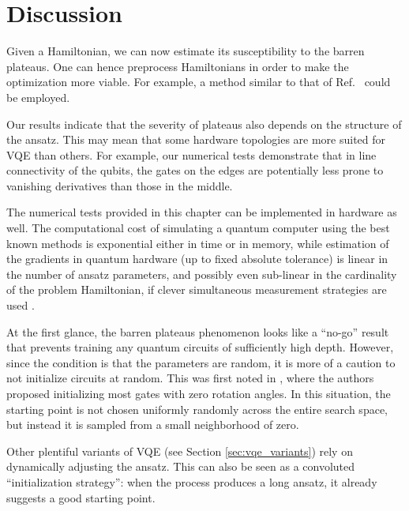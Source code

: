 
\section{Discussion}
Given a Hamiltonian, we can now estimate its susceptibility to the barren plateaus. One can hence preprocess Hamiltonians in order to make the optimization more viable. For example, a method similar to that of Ref.~\cite{ryabinkin_iterative_2020} could be employed.

Our results indicate that the severity of plateaus also depends on the structure of the ansatz. This may mean that some hardware topologies are more suited for VQE than others. For example, our numerical tests demonstrate that in line connectivity of the qubits, the gates on the edges are potentially less prone to vanishing derivatives than those in the middle.

The numerical tests provided in this chapter can be implemented in hardware as well. The computational cost of simulating a quantum computer using the best known methods is exponential either in time or in memory, while estimation of the gradients in quantum hardware (up to fixed absolute tolerance) is linear in the number of ansatz parameters, and possibly even sub-linear in the cardinality of the problem Hamiltonian, if clever simultaneous measurement strategies are used \cite{verteletskyi_measurement_2020}. 

At the first glance, the barren plateaus phenomenon looks like a ``no-go'' result that prevents training any quantum circuits of sufficiently high depth. However, since the condition is that the parameters are random, it is more of a caution to not initialize circuits at random. This was first noted in \cite{grant_initialization_2019}, where the authors proposed initializing most gates with zero rotation angles. In this situation, the starting point is not chosen uniformly randomly across the entire search space, but instead it is sampled from a small neighborhood of zero. 

Other plentiful variants of VQE (see Section \ref{sec:vqe_variants}) rely on dynamically adjusting the ansatz. This can also be seen as a convoluted ``initialization strategy'': when the process produces a long ansatz, it already suggests a good starting point. 

